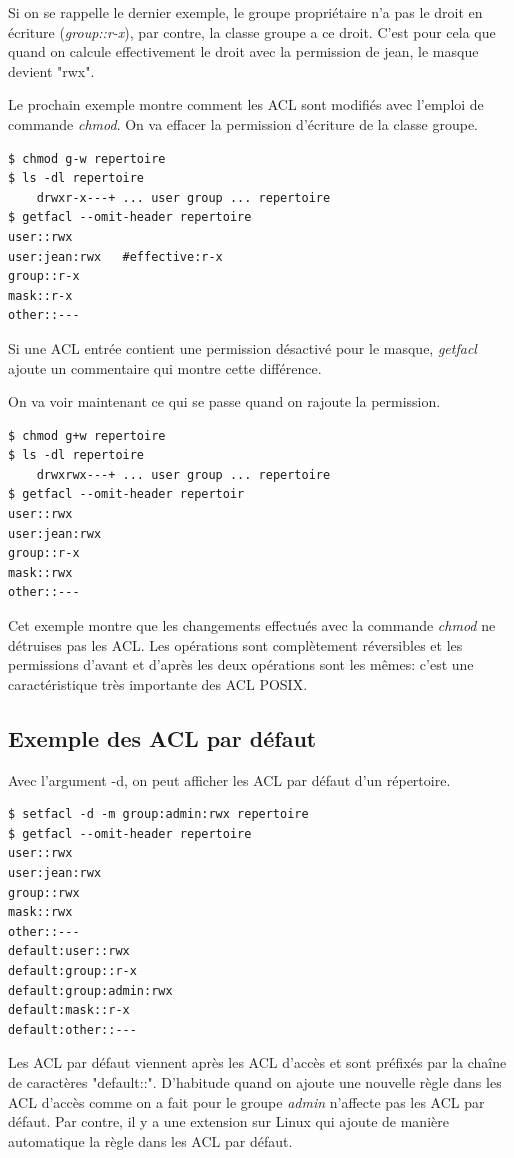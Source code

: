 Si on se rappelle le dernier exemple, le groupe propriétaire n'a pas le droit en écriture (\emph{group::r-x}), par contre, la classe groupe a ce droit. C'est pour cela que quand on calcule effectivement le droit avec la permission de jean, le masque devient "rwx".

Le prochain exemple montre comment les ACL sont modifiés avec l'emploi de commande \emph{chmod}. On va effacer la permission d'écriture de la classe groupe.

\begin{verbatim}
$ chmod g-w repertoire 
$ ls -dl repertoire 
	drwxr-x---+ ... user group ... repertoire 
$ getfacl --omit-header repertoire 
user::rwx 
user:jean:rwx 	#effective:r-x
group::r-x 	
mask::r-x 
other::---

\end{verbatim}

Si une ACL entrée contient une permission désactivé pour le masque, \emph{getfacl} ajoute un commentaire qui montre cette différence.

On va voir maintenant ce qui se passe quand on rajoute la permission. 

\begin{verbatim}
$ chmod g+w repertoire 
$ ls -dl repertoire 
	drwxrwx---+ ... user group ... repertoire 
$ getfacl --omit-header repertoir 
user::rwx 
user:jean:rwx 
group::r-x
mask::rwx
other::---
\end{verbatim}

Cet exemple montre que les changements effectués avec la commande \emph{chmod} ne détruises pas les ACL. Les opérations sont complètement réversibles et les permissions d'avant et d'après les deux opérations sont les mêmes: c'est une caractéristique très importante des ACL POSIX. 

\subsection*{Exemple des ACL par défaut}

Avec l'argument -d, on peut afficher les ACL par défaut d'un répertoire. 

\begin{verbatim}
$ setfacl -d -m group:admin:rwx repertoire 
$ getfacl --omit-header repertoire 
user::rwx
user:jean:rwx
group::rwx 
mask::rwx
other::---
default:user::rwx
default:group::r-x
default:group:admin:rwx
default:mask::r-x
default:other::---
\end{verbatim} 

Les ACL par défaut viennent après les ACL d'accès et sont préfixés par la chaîne de caractères "default::". D'habitude quand on ajoute une nouvelle règle dans les ACL d'accès comme on a fait pour le groupe \emph{admin} n'affecte pas les ACL par défaut. Par contre, il y a une extension sur Linux qui ajoute de manière automatique la règle dans les ACL par défaut. 

